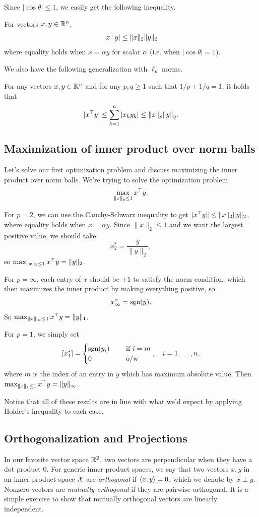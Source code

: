 \documentclass[11 pt]{scrartcl}
\begin{document}
Since $|\cos\theta| \leq 1$, we easily get the following inequality. 
\begin{theorem}
    For vectors $x,y\in \mathbb R^n$, 
    \[ |x^\top y| \leq \|x\|_2 \|y\|_2\] 
    where equality holds when $x = \alpha y$ for scalar $\alpha$ (i.e. when $|\cos\theta| = 1$). 
\end{theorem}

We also have the following generalization with $\ell_p$ norms. 
\begin{theorem}
    For any vectors $x,y\in \mathbb R^n$ and for any $p,q \geq 1$ such that $1/p + 1/q = 1$, it holds that 
    \[ |x^\top y| \leq \sum_{k=1}^n|x_ky_k| \leq \|x\|_p \|y\|_q.\] 
\end{theorem}

\subsection{Maximization of inner product over norm balls}
Let's solve our first optimization problem and discuss maximizing the inner product over norm balls. 
We're trying to solve the optimization problem 
\[ \max_{\|x\|_p\leq 1} x^\top y.\] 

For $p=2$, we can use the Cauchy-Schwarz inequality to get $|x^\top y\| \leq \|x\|_2 \|y\|_2$, where equality holds when $x = \alpha y$. 
Since $\|x\|_2 \leq 1$ and we want the largest positive value, we should take 
\[ x_2^* = \frac{y}{\|y\|_2},\]
so $\max_{\|x\|_2\leq 1} x^\top y = \|y\|_2$. 

For $p=\infty$, each entry of $x$ should be $\pm 1$ to satisfy the norm condition, which then maximizes the inner product by making everything positive, so 
\[ x_\infty^* = \text{sgn}(y).\] 
So $\max_{\|x\|_\infty \leq 1} x^\top y = \|y\|_1$. 

For $p=1$, we simply set 
\[ [x_1^*] = \begin{cases} \text{sgn}(y_i)\quad &\text{ if }i = m \\ 0 \quad &\text{ o/w } \end{cases},\quad i= 1,\dots, n,\] 
where $m$ is the index of an entry in $y$ which has maximum absolute value. 
Then $\max_{\| x\|_1 \leq 1} x^\top y = \|y\|_\infty$. 

Notice that all of these results are in line with what we'd expect by applying Holder's inequality to each case.


\subsection{Orthogonalization and Projections} 
In our favorite vector space $\mathbb R^2$, two vectors are perpendicular when they have a dot product 0.
For generic inner product spaces, we say that two vectors $x,y$ in an inner product space $\mathcal X$ are \emph{orthogonal} if $\langle x,y \rangle = 0$, which we denote by $x\perp y$. 
Nonzero vectors are \emph{mutually orthogonal} if they are pairwise orthogonal.
It is a simple exercise to show that mutually orthogonal vectors are linearly independent.
\end{document}
